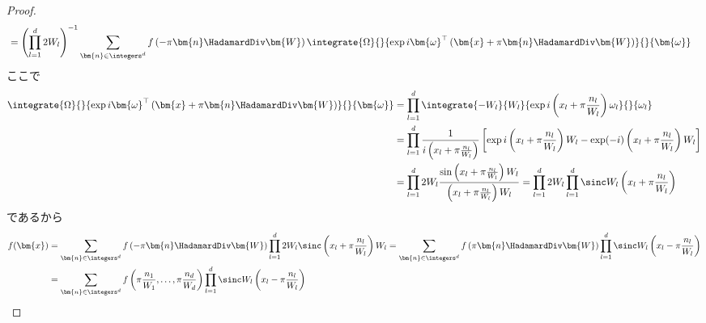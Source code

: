 \begin{proof}
\begin{align*}
            &= \left(\prod_{l=1}^d 2W_l\right)^{-1} \sum_{\bm{n}\in\integers^d} f\left(-\pi\bm{n}\HadamardDiv\bm{W}\right) \integrate{\Omega}{}{\exp i \bm{\omega}^\top\left(\bm{x} + \pi\bm{n}\HadamardDiv\bm{W}\right) }{}{\bm{\omega}}
        \end{align*}
        ここで
        \begin{align*}
            \integrate{\Omega}{}{\exp i \bm{\omega}^\top\left(\bm{x} + \pi\bm{n}\HadamardDiv\bm{W}\right) }{}{\bm{\omega}} &= \prod_{l=1}^d \integrate{-W_l}{W_l}{\exp i\left(x_l + \pi\frac{n_l}{W_l}\right)\omega_l}{}{\omega_l} \\
            &= \prod_{l=1}^d \frac{1}{i\left(x_l + \pi\frac{n_l}{W_l}\right)}\left[\exp i\left(x_l + \pi\frac{n_l}{W_l}\right)W_l - \exp (-i)\left(x_l + \pi\frac{n_l}{W_l}\right)W_l\right] \\
            &= \prod_{l=1}^d 2W_l \frac{\sin \left(x_l + \pi\frac{n_l}{W_l}\right)W_l}{\left(x_l + \pi\frac{n_l}{W_l}\right)W_l} = \prod_{l=1}^d 2W_l \prod_{l=1}^d \sinc W_l\left(x_l + \pi\frac{n_l}{W_l}\right)
        \end{align*}
        であるから
        \begin{align*}
            f(\bm{x}) &= \sum_{\bm{n}\in\integers^d} f\left(-\pi\bm{n}\HadamardDiv\bm{W}\right) \prod_{l=1}^d 2W_l \sinc \left(x_l + \pi\frac{n_l}{W_l}\right)W_l = \sum_{\bm{n}\in\integers^d} f\left(\pi\bm{n}\HadamardDiv\bm{W}\right) \prod_{l=1}^d \sinc W_l\left(x_l - \pi\frac{n_l}{W_l}\right) \\
            &= \sum_{\bm{n}\in\integers^d} f\left(\pi\frac{n_1}{W_1},\dots,\pi\frac{n_d}{W_d}\right) \prod_{l=1}^d \sinc W_l\left(x_l - \pi\frac{n_l}{W_l}\right)
        \end{align*}
    \end{proof}